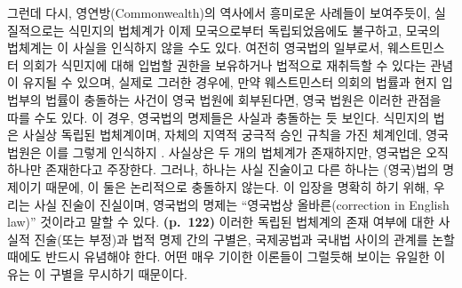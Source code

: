 그런데 다시, 영연방(Commonwealth)의 역사에서 흥미로운 사례들이
보여주듯이, 실질적으로는 식민지의 법체계가 이제 모국으로부터
독립되었음에도 불구하고, 모국의 법체계는 이 사실을 인식하지 않을 수도
있다. 여전히 영국법의 일부로서, 웨스트민스터 의회가 식민지에 대해 입법할
권한을 보유하거나 법적으로 재취득할 수 있다는 관념이 유지될 수 있으며,
실제로 그러한 경우에, 만약 웨스트민스터 의회의 법률과 현지 입법부의
법률이 충돌하는 사건이 영국 법원에 회부된다면, 영국 법원은 이러한 관점을
따를 수도 있다. 이 경우, 영국법의 명제들은 사실과 충돌하는 듯 보인다.
식민지의 법은 사실상 독립된 법체계이며, 자체의 지역적 궁극적 승인 규칙을
가진 체계인데, 영국 법원은 이를 그렇게 인식하지 .
사실상은 두 개의 법체계가 존재하지만, 영국법은 오직 하나만 존재한다고
주장한다. 그러나, 하나는 사실 진술이고 다른 하나는 (영국)법의 명제이기
때문에, 이 둘은 논리적으로 충돌하지 않는다. 이 입장을 명확히 하기 위해,
우리는 사실 진술이 진실이며, 영국법의 명제는 ``영국법상
올바른(correction in English law)'' 것이라고 말할 수 있다.
\textbf{(p.~122)} 이러한 독립된 법체계의 존재 여부에 대한 사실적
진술(또는 부정)과 법적 명제 간의 구별은, 국제공법과 국내법 사이의 관계를
논할 때에도 반드시 유념해야 한다. 어떤 매우 기이한 이론들이 그럴듯해
보이는 유일한 이유는 이 구별을 무시하기 때문이다.

